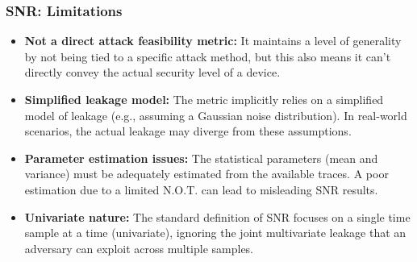 \begin{frame}
    \frametitle{SNR: Limitations}
        \begin{itemize}
            \item \textbf{Not a direct attack feasibility metric:} It maintains a level of generality by not being tied to a specific attack method, but this also means it can't directly convey the actual security level of a device.
            \item \textbf{Simplified leakage model:} The metric implicitly relies on a simplified model of leakage (e.g., assuming a Gaussian noise distribution). In real-world scenarios, the actual leakage may diverge from these assumptions.
            \item \textbf{Parameter estimation issues:} The statistical parameters (mean and variance) must be adequately estimated from the available traces. A poor estimation due to a limited N.O.T. can lead to misleading SNR results.
            \item \textbf{Univariate nature:} The standard definition of SNR focuses on a single time sample at a time (univariate), ignoring the joint multivariate leakage that an adversary can exploit across multiple samples. 
        \end{itemize}
\end{frame}

